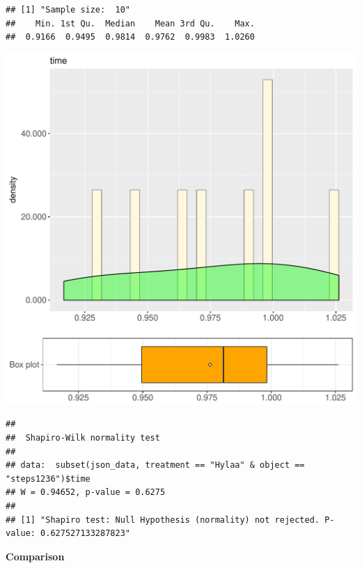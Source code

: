 \documentclass{article}\usepackage[]{graphicx}\usepackage[]{color}
\makeatletter
\def\maxwidth{ %
  \ifdim\Gin@nat@width>\linewidth
    \linewidth
  \else
    \Gin@nat@width
  \fi
}
\newenvironment{kframe}{%
 \def\at@end@of@kframe{}%
 \ifinner\ifhmode%
  \def\at@end@of@kframe{\end{minipage}}%
  \begin{minipage}{\columnwidth}%
 \fi\fi%
 \def\FrameCommand##1{\hskip\@totalleftmargin \hskip-\fboxsep
 \colorbox{shadecolor}{##1}\hskip-\fboxsep
     \hskip-\linewidth \hskip-\@totalleftmargin \hskip\columnwidth}%
 \MakeFramed {\advance\hsize-\width
   \@totalleftmargin\z@ \linewidth\hsize
   \@setminipage}}%
 {\par\unskip\endMakeFramed%
 \at@end@of@kframe}
\newenvironment{knitrout}{}{} %
\makeatother
\begin{document}
\begin{knitrout}
\color{fgcolor}\begin{kframe}
\begin{verbatim}
## [1] "Sample size:  10"
##    Min. 1st Qu.  Median    Mean 3rd Qu.    Max. 
##  0.9166  0.9495  0.9814  0.9762  0.9983  1.0260
\end{verbatim}
\end{kframe}
\includegraphics[width=\maxwidth]{figure/RH2_Hylaa_steps1236-1} 
\begin{kframe}\begin{verbatim}
## 
## 	Shapiro-Wilk normality test
## 
## data:  subset(json_data, treatment == "Hylaa" & object == "steps1236")$time
## W = 0.94652, p-value = 0.6275
## 
## [1] "Shapiro test: Null Hypothesis (normality) not rejected. P-value: 0.627527133287823"
\end{verbatim}
\end{kframe}
\end{knitrout}
  
 \textbf{Comparison}
  
\end{document}
